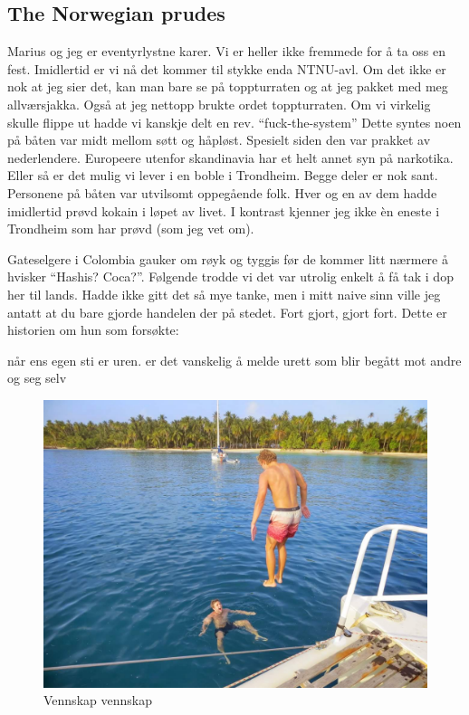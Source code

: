 \subsection*{The Norwegian prudes}

Marius og jeg er eventyrlystne karer. Vi er heller ikke fremmede for å
ta oss en fest. Imidlertid er vi nå det kommer til stykke enda
NTNU-avl. Om det ikke er nok at jeg sier det, kan man bare se på
toppturraten og at jeg pakket med meg allværsjakka. Også at jeg
nettopp brukte ordet toppturraten.
Om vi virkelig skulle flippe ut hadde vi kanskje delt en rev.
``fuck-the-system''
Dette syntes noen  på båten var midt mellom søtt og håpløst. Spesielt siden den var prakket av
nederlendere. Europeere utenfor skandinavia har et helt annet syn på narkotika. Eller så
er det mulig vi lever i en boble i Trondheim. Begge deler er nok sant.
Personene på båten var utvilsomt oppegående folk. Hver og en av dem
hadde imidlertid prøvd kokain i løpet av livet. I kontrast kjenner jeg
ikke èn eneste i Trondheim som har prøvd (som jeg vet om).

Gateselgere i Colombia gauker om røyk og tyggis før de kommer litt
nærmere å hvisker ``Hashis? Coca?''.  Følgende trodde vi det var
utrolig enkelt å få tak i dop her til lands. Hadde ikke gitt det så
mye tanke, men i mitt naive sinn ville jeg antatt at du bare gjorde
handelen der på stedet. Fort gjort, gjort fort. Dette er historien om
hun som forsøkte:

når ens egen sti er uren. 
er det vanskelig å melde urett som blir begått mot andre og seg selv
\begin{figure}[h]
	\centering
	\includegraphics[width=\textwidth]{vennskapvol2}
	\caption{Vennskap vennskap}
	\label{fig:vennskap}
\end{figure}


